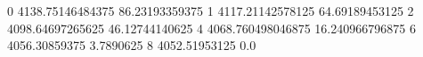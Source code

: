 0 4138.75146484375 86.23193359375
1 4117.21142578125 64.69189453125
2 4098.64697265625 46.12744140625
4 4068.760498046875 16.240966796875
6 4056.30859375 3.7890625
8 4052.51953125 0.0
